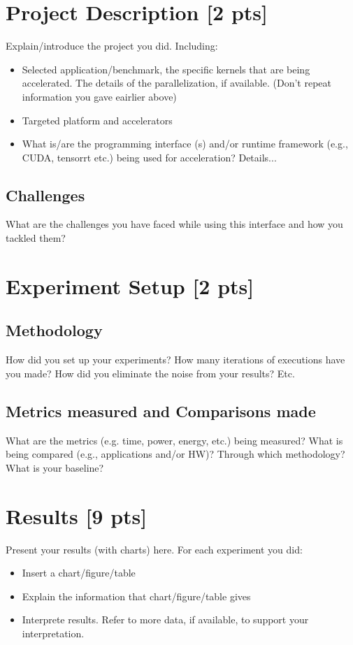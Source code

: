 \documentclass[sigconf,authorversion,nonacm]{acmart}
\begin{document}
\section{Project Description  {\small {[2 pts]}}}
Explain/introduce the project you did. Including: 
\begin{itemize}
    \item Selected application/benchmark, the specific kernels that are being accelerated. The details of the parallelization, if available. (Don't repeat information you gave eairlier above)
    \item Targeted platform and accelerators
    \item What is/are the programming interface (s) and/or runtime framework (e.g., CUDA, tensorrt etc.) being used for acceleration? Details...
\end{itemize}

\subsection{Challenges}
What are the challenges you have faced  while using this interface and how you tackled them?

\section{Experiment Setup  {\small {[2 pts]}}}

\subsection{Methodology}  
How did you set up your experiments? How many iterations of executions have you made? How did you eliminate the noise from your results? Etc.

\subsection{Metrics measured and Comparisons made}
What are the metrics (e.g. time, power, energy, etc.) being measured? What is being compared (e.g., applications and/or HW)? Through which methodology? What is your baseline?

\section{Results {\small {[9 pts]}}}  
Present your results (with charts) here. For each experiment you did:
\begin{itemize}
    \item Insert a chart/figure/table 
    \item Explain the information that chart/figure/table gives
    \item Interprete results. Refer to more data, if available, to support your interpretation. 
\end{itemize}
\end{document}
